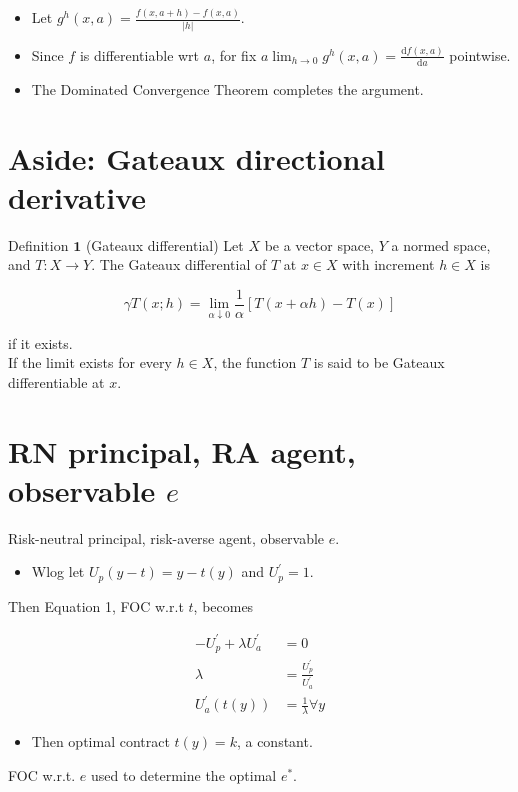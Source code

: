 \documentclass[10pt]{article}
\begin{document}
\begin{itemize}
  \item Let $g^{h}(x, a)=\frac{f(x, a+h)-f(x, a)}{|h|}$.
  \item Since $f$ is differentiable wrt $a$, for fix $a \lim _{h \rightarrow 0} g^{h}(x, a)=\frac{\mathrm{d} f(x, a)}{\mathrm{d} a}$ pointwise.
  \item The Dominated Convergence Theorem completes the argument.
\end{itemize}

\section*{Aside: Gateaux directional derivative}
Definition $\mathbf{1}$ (Gateaux differential) Let $X$ be a vector space, $Y$ a normed space, and $T: X \rightarrow Y$. The Gateaux differential of $T$ at $x \in X$ with increment $h \in X$ is

$$
\gamma T(x ; h)=\lim _{\alpha \downarrow 0} \frac{1}{\alpha}[T(x+\alpha h)-T(x)]
$$

if it exists.\\
If the limit exists for every $h \in X$, the function $T$ is said to be Gateaux differentiable at $x$.

\section*{RN principal, RA agent, observable $e$}
Risk-neutral principal, risk-averse agent, observable $e$.

\begin{itemize}
  \item Wlog let $U_{p}(y-t)=y-t(y)$ and $U_{p}^{\prime}=1$.
\end{itemize}

Then Equation 1, FOC w.r.t $t$, becomes

$$
\begin{aligned}
-U_{p}^{\prime}+\lambda U_{a}^{\prime} & =0 \\
\lambda & =\frac{U_{p}^{\prime}}{U_{a}^{\prime}} \\
U_{a}^{\prime}(t(y)) & =\frac{1}{\lambda} \forall y
\end{aligned}
$$

\begin{itemize}
  \item Then optimal contract $t(y)=k$, a constant.
\end{itemize}

FOC w.r.t. $e$ used to determine the optimal $e^{*}$.
\end{document}
